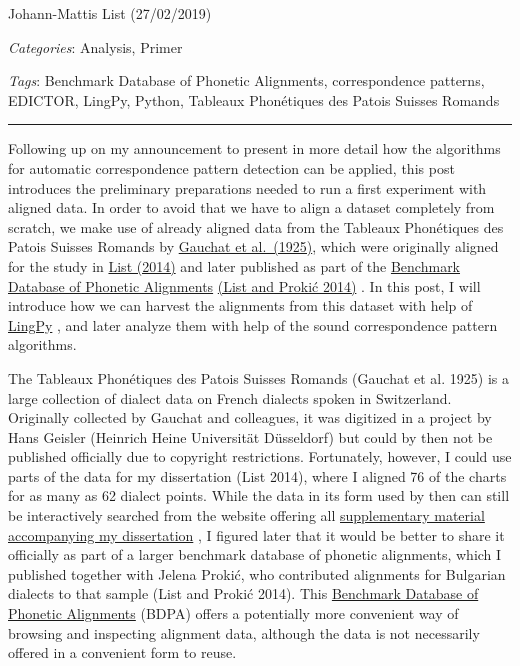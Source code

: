 \documentclass[
  a4paper,
  14pt,
  oneside,
  tablecaptionabove
]{scrbook}
\begin{document}
Johann-Mattis List (27/02/2019)

\emph{Categories}: Analysis, Primer

\emph{Tags}: Benchmark Database of Phonetic Alignments, correspondence
patterns, EDICTOR, LingPy, Python, Tableaux Phonétiques des Patois
Suisses Romands

\begin{center}\rule{0.5\linewidth}{1pt}\end{center}

Following up on my announcement to present in more detail how the
algorithms for automatic correspondence pattern detection can be
applied, this post introduces the preliminary preparations needed to run
a first experiment with aligned data. In order to avoid that we have to
align a dataset completely from scratch, we make use of already aligned
data from the Tableaux Phonétiques des Patois Suisses Romands by
\href{http://bibliography.lingpy.org?key=Gauchat1925}{Gauchat et
al.~(1925)}, which were originally aligned for the study in
\href{http://bibliography.lingpy.org?key=List2014d}{List (2014)} and
later published as part of the
\href{http://alignments.lingpy.org}{Benchmark Database of Phonetic
Alignments} \href{http://bibliography.lingpy.org?key=List2014e}{(List
and Prokić 2014)} . In this post, I will introduce how we can harvest
the alignments from this dataset with help of
\href{http://lingpy.org}{LingPy} , and later analyze them with help of
the sound correspondence pattern algorithms.

The Tableaux Phonétiques des Patois Suisses Romands (Gauchat et al.
1925) is a large collection of dialect data on French dialects spoken in
Switzerland. Originally collected by Gauchat and colleagues, it was
digitized in a project by Hans Geisler (Heinrich Heine Universität
Düsseldorf) but could by then not be published officially due to
copyright restrictions. Fortunately, however, I could use parts of the
data for my dissertation (List 2014), where I aligned 76 of the charts
for as many as 62 dialect points. While the data in its form used by
then can still be interactively searched from the website offering all
\href{https://sequencecomparison.github.io}{supplementary material
accompanying my dissertation} , I figured later that it would be better
to share it officially as part of a larger benchmark database of
phonetic alignments, which I published together with Jelena Prokić, who
contributed alignments for Bulgarian dialects to that sample (List and
Prokić 2014). This \href{http://alignments.lingpy.org}{Benchmark
Database of Phonetic Alignments} (BDPA) offers a potentially more
convenient way of browsing and inspecting alignment data, although the
data is not necessarily offered in a convenient form to reuse.
\end{document}
